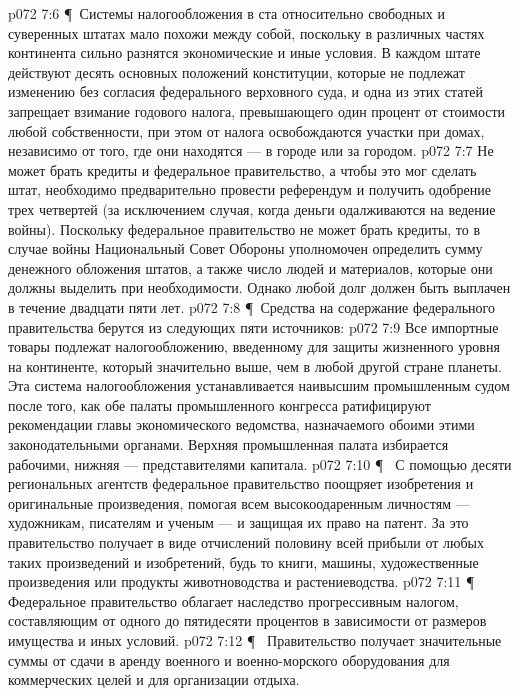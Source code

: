\vs p072 7:6 \P\ Системы налогообложения в ста относительно свободных и суверенных штатах мало похожи между собой, поскольку в различных частях континента сильно разнятся экономические и иные условия. В каждом штате действуют десять основных положений конституции, которые не подлежат изменению без согласия федерального верховного суда, и одна из этих статей запрещает взимание годового налога, превышающего один процент от стоимости любой собственности, при этом от налога освобождаются участки при домах, независимо от того, где они находятся --- в городе или за городом.
\vs p072 7:7 Не может брать кредиты и федеральное правительство, а чтобы это мог сделать штат, необходимо предварительно провести референдум и получить одобрение трех четвертей (за исключением случая, когда деньги одалживаются на ведение войны). Поскольку федеральное правительство не может брать кредиты, то в случае войны Национальный Совет Обороны уполномочен определить сумму денежного обложения штатов, а также число людей и материалов, которые они должны выделить при необходимости. Однако любой долг должен быть выплачен в течение двадцати пяти лет.
\vs p072 7:8 \P\ Средства на содержание федерального правительства берутся из следующих пяти источников:
\vs p072 7:9 \bibnobreakspace {} Все импортные товары подлежат налогообложению, введенному для защиты жизненного уровня на континенте, который значительно выше, чем в любой другой стране планеты. Эта система налогообложения устанавливается наивысшим промышленным судом после того, как обе палаты промышленного конгресса ратифицируют рекомендации главы экономического ведомства, назначаемого обоими этими законодательными органами. Верхняя промышленная палата избирается рабочими, нижняя --- представителями капитала.
\vs p072 7:10 \P\ \bibnobreakspace {} С помощью десяти региональных агентств федеральное правительство поощряет изобретения и оригинальные произведения, помогая всем высокоодаренным личностям --- художникам, писателям и ученым --- и защищая их право на патент. За это правительство получает в виде отчислений половину всей прибыли от любых таких произведений и изобретений, будь то книги, машины, художественные произведения или продукты животноводства и растениеводства.
\vs p072 7:11 \P\ \bibnobreakspace {} Федеральное правительство облагает наследство прогрессивным налогом, составляющим от одного до пятидесяти процентов в зависимости от размеров имущества и иных условий.
\vs p072 7:12 \P\ \bibnobreakspace {} Правительство получает значительные суммы от сдачи в аренду военного и военно\hyp{}морского оборудования для коммерческих целей и для организации отдыха.
